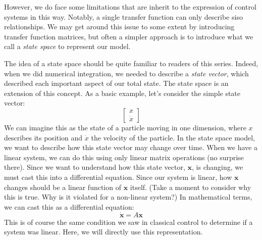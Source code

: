 However, we do face some limitations that are inherit to the expression of control systems in this way. Notably, a single transfer function can only describe \gls{siso} relationships. We may get around this issue to some extent by introducing transfer function matrices, but often a simpler approach is to introduce what we call a \textit{state space} to represent our model.

The idea of a state space should be quite familiar to readers of this series. Indeed, when we did numerical integration, we needed to describe a \textit{state vector}, which described each important aspect of our total state. The state space is an extension of this concept. As a basic example, let's consider the simple state vector:
$$\begin{bmatrix}
    x\\
    \dot{x}
\end{bmatrix}$$
We can imagine this as the state of a particle moving in one dimension, where $x$ describes its position and $\dot{x}$ the velocity of the particle. In the state space model, we want to describe how this state vector may change over time. When we have a linear system, we can do this using only linear matrix operations (no surprise there). Since we want to understand how this state vector, $\bm{x}$, is changing, we must cast this into a differential equation. Since our system is linear, how $\bm{x}$ changes should be a linear function of $\bm{x}$ itself. (Take a moment to consider why this is true. Why is it violated for a non-linear system?) In mathematical terms, we can cast this as a differential equation:
$$\bm{\dot{x}}=A\bm{x}$$
This is of course the same condition we saw in classical control to determine if a system was linear. Here, we will directly use this representation.
